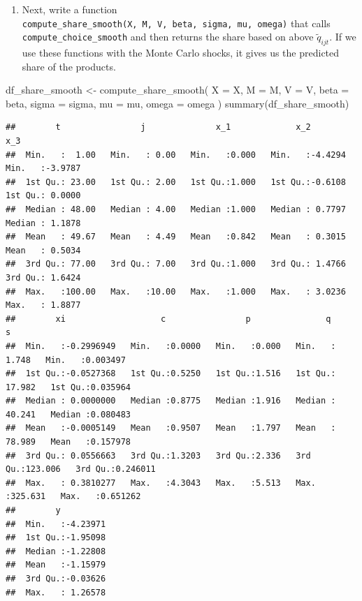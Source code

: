 \documentclass[
]{book}
\newenvironment{Shaded}{\begin{snugshade}}{\end{snugshade}}
\newcommand{\AttributeTok}[1]{\textcolor[rgb]{0.77,0.63,0.00}{#1}}
\newcommand{\FunctionTok}[1]{\textcolor[rgb]{0.00,0.00,0.00}{#1}}
\newcommand{\NormalTok}[1]{#1}
\newcommand{\OtherTok}[1]{\textcolor[rgb]{0.56,0.35,0.01}{#1}}
\providecommand{\tightlist}{%
  \setlength{\itemsep}{0pt}\setlength{\parskip}{0pt}}
\begin{document}
\begin{enumerate}
\def\labelenumi{\arabic{enumi}.}
\setcounter{enumi}{8}
\tightlist
\item
  Next, write a function \texttt{compute\_share\_smooth(X,\ M,\ V,\ beta,\ sigma,\ mu,\ omega)} that calls \texttt{compute\_choice\_smooth} and then returns the share based on above \(\tilde{q}_{ijt}\). If we use these functions with the Monte Carlo shocks, it gives us the predicted share of the products.
\end{enumerate}

\begin{Shaded}
\begin{Highlighting}[]
\NormalTok{df\_share\_smooth }\OtherTok{\textless{}{-}} 
  \FunctionTok{compute\_share\_smooth}\NormalTok{(}
    \AttributeTok{X =}\NormalTok{ X, }
    \AttributeTok{M =}\NormalTok{ M, }
    \AttributeTok{V =}\NormalTok{ V, }
    \AttributeTok{beta =}\NormalTok{ beta, }
    \AttributeTok{sigma =}\NormalTok{ sigma, }
    \AttributeTok{mu =}\NormalTok{ mu, }
    \AttributeTok{omega =}\NormalTok{ omega}
\NormalTok{    )}
\FunctionTok{summary}\NormalTok{(df\_share\_smooth)}
\end{Highlighting}
\end{Shaded}

\begin{verbatim}
##        t                j              x_1             x_2               x_3         
##  Min.   :  1.00   Min.   : 0.00   Min.   :0.000   Min.   :-4.4294   Min.   :-3.9787  
##  1st Qu.: 23.00   1st Qu.: 2.00   1st Qu.:1.000   1st Qu.:-0.6108   1st Qu.: 0.0000  
##  Median : 48.00   Median : 4.00   Median :1.000   Median : 0.7797   Median : 1.1878  
##  Mean   : 49.67   Mean   : 4.49   Mean   :0.842   Mean   : 0.3015   Mean   : 0.5034  
##  3rd Qu.: 77.00   3rd Qu.: 7.00   3rd Qu.:1.000   3rd Qu.: 1.4766   3rd Qu.: 1.6424  
##  Max.   :100.00   Max.   :10.00   Max.   :1.000   Max.   : 3.0236   Max.   : 1.8877  
##        xi                   c                p               q                 s           
##  Min.   :-0.2996949   Min.   :0.0000   Min.   :0.000   Min.   :  1.748   Min.   :0.003497  
##  1st Qu.:-0.0527368   1st Qu.:0.5250   1st Qu.:1.516   1st Qu.: 17.982   1st Qu.:0.035964  
##  Median : 0.0000000   Median :0.8775   Median :1.916   Median : 40.241   Median :0.080483  
##  Mean   :-0.0005149   Mean   :0.9507   Mean   :1.797   Mean   : 78.989   Mean   :0.157978  
##  3rd Qu.: 0.0556663   3rd Qu.:1.3203   3rd Qu.:2.336   3rd Qu.:123.006   3rd Qu.:0.246011  
##  Max.   : 0.3810277   Max.   :4.3043   Max.   :5.513   Max.   :325.631   Max.   :0.651262  
##        y           
##  Min.   :-4.23971  
##  1st Qu.:-1.95098  
##  Median :-1.22808  
##  Mean   :-1.15979  
##  3rd Qu.:-0.03626  
##  Max.   : 1.26578
\end{verbatim}
\end{document}
